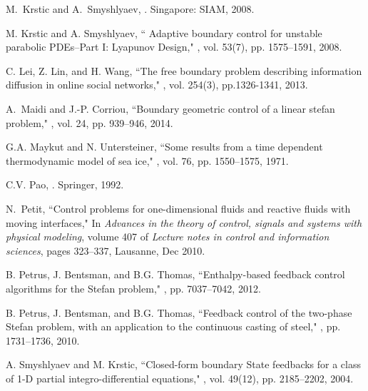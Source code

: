\documentclass[journal]{IEEEtran}
\begin{document}
\begin{thebibliography}{99}
M.~Krstic and A.~Smyshlyaev,
.
\newblock Singapore: SIAM, 2008.

 M. Krstic and A. Smyshlyaev,
 \newblock `` Adaptive boundary control for unstable parabolic PDEs--Part I: Lyapunov Design,"
, vol. 53(7), pp. 1575--1591, 2008.

C. Lei, Z. Lin, and H. Wang, 
\newblock ``The free boundary problem describing information diffusion in online social networks,"
, vol. 254(3), pp.1326-1341, 2013.

A.~Maidi and J.-P. Corriou,
\newblock ``Boundary geometric control of a linear stefan problem,"
, vol. 24, pp. 939--946, 2014.

G.A. Maykut and N. Untersteiner,
\newblock ``Some results from a time dependent thermodynamic model of sea ice,"
, vol. 76, pp. 1550--1575, 1971.

C.V. Pao,
.
\newblock Springer, 1992.

N.~Petit,
\newblock ``Control problems for one-dimensional fluids and reactive fluids with
  moving interfaces,"
\newblock In {\em Advances in the theory of control, signals and systems with
  physical modeling}, volume 407 of {\em Lecture notes in control and
  information sciences}, pages 323--337, Lausanne, Dec 2010.
  
B. Petrus, J. Bentsman, and B.G. Thomas,
\newblock ``Enthalpy-based feedback control algorithms for the Stefan problem,"
, pp. 7037--7042, 2012.

B. Petrus, J. Bentsman, and B.G. Thomas,
\newblock ``Feedback control of the two-phase Stefan problem, with an application to the continuous casting of steel,"
, pp. 1731--1736, 2010.

A. Smyshlyaev and M. Krstic,
\newblock ``Closed-form boundary State feedbacks for a class of 1-D partial integro-differential equations,"
, vol. 49(12), pp. 2185--2202, 2004.


\end{thebibliography}
\end{document}
